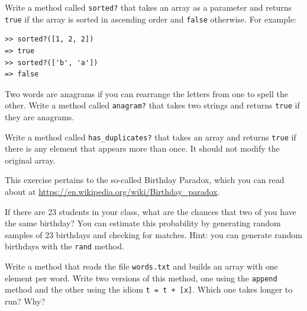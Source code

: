 \documentclass[10pt]{book}
\begin{document}
\begin{exercise}
Write a method called \verb"sorted?" that takes an array as a
parameter and returns {\tt true} if the array is sorted in ascending
order and {\tt false} otherwise.  For example:

\begin{verbatim}
>> sorted?([1, 2, 2])
=> true
>> sorted?(['b', 'a'])
=> false
\end{verbatim}

\end{exercise}


\begin{exercise}
\label{anagram}

Two words are anagrams if you can rearrange the letters from one
to spell the other.  Write a method called \verb"anagram?"
that takes two strings and returns {\tt true} if they are anagrams.
\end{exercise}



\begin{exercise}
\label{duplicate}

Write a method called \verb"has_duplicates?" that takes
an array and returns {\tt true} if there is any element that
appears more than once.  It should not modify the original
array.

\end{exercise}


\begin{exercise}

This exercise pertains to the so-called Birthday Paradox, which you
can read about at \url{https://en.wikipedia.org/wiki/Birthday_paradox}.

If there are 23 students in your class, what are the chances
that two of you have the same birthday?  You can estimate this
probability by generating random samples of 23 birthdays
and checking for matches.  Hint: you can generate random birthdays
with the {\tt rand} method.


\end{exercise}



\begin{exercise}

Write a method that reads the file {\tt words.txt} and builds
an array with one element per word.  Write two versions of
this method, one using the {\tt append} method and the
other using the idiom {\tt t = t + [x]}.  Which one takes
longer to run?  Why?


\end{exercise}
\end{document}
